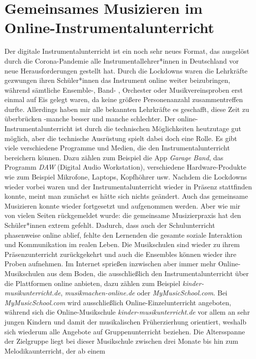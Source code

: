 \section{Gemeinsames Musizieren im Online-Instrumentalunterricht}

Der digitale Instrumentalunterricht ist ein noch sehr neues Format, das
ausgelöst durch die Corona-Pandemie alle Instrumentallehrer*innen in Deutschland vor neue
Herausforderungen gestellt hat. Durch die Lockdowns waren die Lehrkräfte
gezwungen ihren Schüler*innen das Instrument online weiter beizubringen, während
sämtliche Ensemble-, Band- , Orchester oder Musikvereinsproben erst einmal auf
Eis gelegt waren, da keine größere Personenanzahl zusammentreffen durfte.
Allerdings haben mir alle bekannten Lehrkräfte es geschafft, diese Zeit zu
überbrücken -manche besser und manche schlechter. Der
online-Instrumentalunterricht ist durch die technischen
Möglichkeiten heutzutage gut möglich, aber die technische Ausrüstung spielt
dabei doch eine Rolle. Es gibt viele verschiedene Programme und Medien, die den
Instrumentalunterricht bereichern können. Dazu zählen zum Beispiel die App
\emph{Garage Band}, das Programm \emph{DAW} (Digital Audio Workstation),
verschiedene Hardware-Produkte wie zum Beispiel Mikrofone, Laptops, Kopfhöhrer
usw. Nachdem die Lockdowns wieder vorbei waren und der Instrumentalunterricht
wieder in Präsenz stattfinden konnte, meint man zunächst es hätte sich nichts
geändert. Auch das gemeinsame Musizieren konnte wieder fortgesetzt und
aufgenommen werden. Aber wie mir von vielen Seiten rückgemeldet wurde: die
gemeinsame Musizierpraxis hat den Schüler*innen extrem gefehlt. Dadurch, dass
auch der Schulunterricht phasenweise online ablief, fehlte den Lernenden die
gesamte soziale Interaktion und Kommunikation im realen Leben. Die Musikschulen
sind wieder zu ihrem Präsenzunterricht zurückgekehrt und auch die Ensembles
können wieder ihre Proben aufnehmen. Im Internet sprießen inzwischen aber immer
mehr Online-Musikschulen aus dem Boden, die ausschließlich den
Instrumentalunterricht über die Plattformen online anbieten, dazu zählen zum
Beispiel \emph{kinder-musikunterricht.de}, \emph{musikmachen-online.de} oder
\emph{MyMusicSchool.com}. Bei \emph{MyMusicSchool.com} wird ausschließlich
Online-Einzelunterricht angeboten, während sich die Online-Musikschule
\emph{kinder-musikunterricht.de} vor allem an sehr jungen Kindern und damit der
musikalischen Früherzierhung orientiert, weshalb sich wiederum alle Angebote auf
Gruppenunterricht beziehen. Die Altersspanne der Zielgruppe liegt bei dieser
Musikschule zwischen drei Monate bis hin zum Melodikaunterricht, der ab einem
